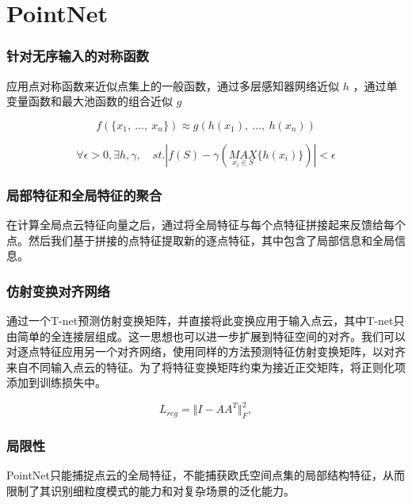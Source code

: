 \section{PointNet}

\begin{frame}
 \frametitle{针对无序输入的对称函数}

应用点对称函数来近似点集上的一般函数，通过多层感知器网络近似 $h$ ，通过单变量函数和最大池函数的组合近似 $g$



\begin{equation*} f(\{x_{1},\ \ldots,\ x_{n}\})\approx g(h(x_{1}),\ \ldots,\ h(x_{n}))\end{equation*}



\begin{equation*} \forall\epsilon >0,\exists h,\gamma,\quad st. \left\vert f(S)-\gamma\left(\underset{x_{i}\in S}{MAX} \{h(x_{i})\}\right)\right\vert < \epsilon \end{equation*}

    
\end{frame}

\begin{frame}
\frametitle{局部特征和全局特征的聚合}

在计算全局点云特征向量之后，通过将全局特征与每个点特征拼接起来反馈给每个点。然后我们基于拼接的点特征提取新的逐点特征，其中包含了局部信息和全局信息。
    
\end{frame}

\begin{frame}
\frametitle{仿射变换对齐网络}

通过一个T-net预测仿射变换矩阵，并直接将此变换应用于输入点云，其中T-net只由简单的全连接层组成。这一思想也可以进一步扩展到特征空间的对齐。我们可以对逐点特征应用另一个对齐网络，使用同样的方法预测特征仿射变换矩阵，以对齐来自不同输入点云的特征。为了将特征变换矩阵约束为接近正交矩阵，将正则化项添加到训练损失中。

\begin{equation*} L_{reg}=\Vert I-AA^{T}\Vert_{F}^{2},\tag{2} \end{equation*}

    
\end{frame}

\begin{frame}
\frametitle{局限性}
PointNet只能捕捉点云的全局特征，不能捕获欧氏空间点集的局部结构特征，从而限制了其识别细粒度模式的能力和对复杂场景的泛化能力。
\end{frame}

